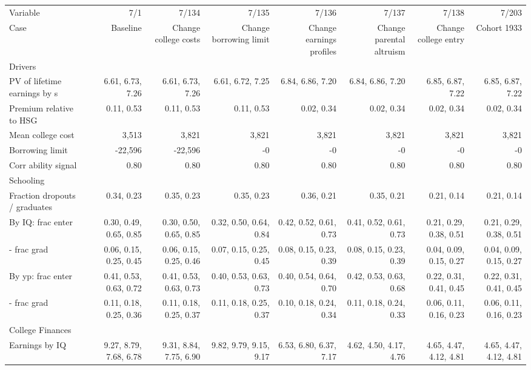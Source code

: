 \begin{tabular}{lrrrrrrr}
\hline
Variable & 7/1  & 7/134  & 7/135  & 7/136  & 7/137  & 7/138  & 7/203  \\ 
Case & Baseline  & Change college costs  & Change borrowing limit  & Change earnings profiles  & Change parental altruism  & Change college entry  & Cohort 1933  \\ 
Drivers &   &   &   &   &   &   &   \\ 
PV of lifetime earnings by s & 6.61, 6.73, 7.26  & 6.61, 6.73, 7.26  & 6.61, 6.72, 7.25  & 6.84, 6.86, 7.20  & 6.84, 6.86, 7.20  & 6.85, 6.87, 7.22  & 6.85, 6.87, 7.22  \\ 
Premium relative to HSG & 0.11, 0.53  & 0.11, 0.53  & 0.11, 0.53  & 0.02, 0.34  & 0.02, 0.34  & 0.02, 0.34  & 0.02, 0.34  \\ 
Mean college cost & 3,513  & 3,821  & 3,821  & 3,821  & 3,821  & 3,821  & 3,821  \\ 
Borrowing limit & -22,596  & -22,596  & -0  & -0  & -0  & -0  & -0  \\ 
Corr ability signal & 0.80  & 0.80  & 0.80  & 0.80  & 0.80  & 0.80  & 0.80  \\ 
\hline
Schooling &   &   &   &   &   &   &   \\ 
Fraction dropouts / graduates & 0.34, 0.23  & 0.35, 0.23  & 0.35, 0.23  & 0.36, 0.21  & 0.35, 0.21  & 0.21, 0.14  & 0.21, 0.14  \\ 
By IQ: frac enter & 0.30, 0.49, 0.65, 0.85  & 0.30, 0.50, 0.65, 0.85  & 0.32, 0.50, 0.64, 0.84  & 0.42, 0.52, 0.61, 0.73  & 0.41, 0.52, 0.61, 0.73  & 0.21, 0.29, 0.38, 0.51  & 0.21, 0.29, 0.38, 0.51  \\ 
- frac grad & 0.06, 0.15, 0.25, 0.45  & 0.06, 0.15, 0.25, 0.46  & 0.07, 0.15, 0.25, 0.45  & 0.08, 0.15, 0.23, 0.39  & 0.08, 0.15, 0.23, 0.39  & 0.04, 0.09, 0.15, 0.27  & 0.04, 0.09, 0.15, 0.27  \\ 
By yp: frac enter & 0.41, 0.53, 0.63, 0.72  & 0.41, 0.53, 0.63, 0.73  & 0.40, 0.53, 0.63, 0.73  & 0.40, 0.54, 0.64, 0.70  & 0.42, 0.53, 0.63, 0.68  & 0.22, 0.31, 0.41, 0.45  & 0.22, 0.31, 0.41, 0.45  \\ 
- frac grad & 0.11, 0.18, 0.25, 0.36  & 0.11, 0.18, 0.25, 0.37  & 0.11, 0.18, 0.25, 0.37  & 0.10, 0.18, 0.24, 0.34  & 0.11, 0.18, 0.24, 0.33  & 0.06, 0.11, 0.16, 0.23  & 0.06, 0.11, 0.16, 0.23  \\ 
\hline
College Finances &   &   &   &   &   &   &   \\ 
Earnings by IQ & 9.27, 8.79, 7.68, 6.78  & 9.31, 8.84, 7.75, 6.90  & 9.82, 9.79, 9.15, 9.17  & 6.53, 6.80, 6.37, 7.17  & 4.62, 4.50, 4.17, 4.76  & 4.65, 4.47, 4.12, 4.81  & 4.65, 4.47, 4.12, 4.81  \\ 

\end{tabular}
